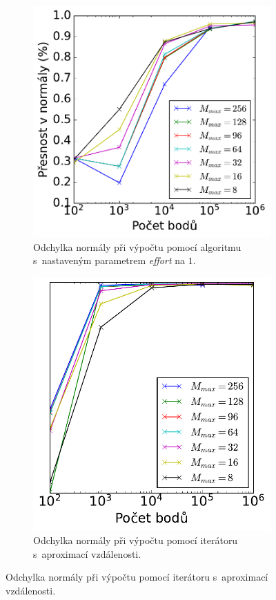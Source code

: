 \begin{figure}
\begin{subfigure}[t]{0.49\columnwidth}
\end{subfigure}
\hfill
\begin{subfigure}[t]{0.49\columnwidth}
    \centering  
    \includegraphics[scale=0.6]{obrazky-figures/benchmark/accuracy/normal/acccurucy_leaf1_err_normal.pdf}
    \caption{Odchylka normály při výpočtu pomocí  algoritmu  s~nastaveným parametrem \emph{effort} na $1$.}
\end{subfigure}
\hfill
\begin{subfigure}[t]{0.49\columnwidth}
    \includegraphics[scale=0.6]{obrazky-figures/benchmark/accuracy/normal/acccurucy_it_err_normal.pdf}
    \centering  
    \caption{Odchylka normály při výpočtu pomocí iterátoru s~aproximací vzdálenosti.}


\end{subfigure}
\end{figure}
